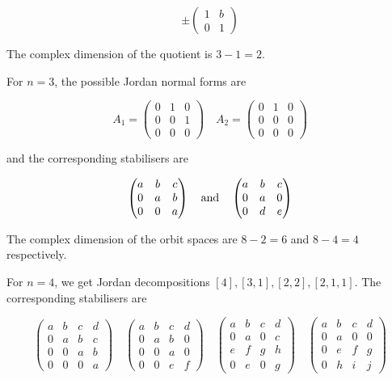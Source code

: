 \documentclass{article}
\begin{document}
\[\pm\begin{pmatrix}
    1 & b \\ 0 & 1
\end{pmatrix}\]

The complex dimension of the quotient is \(3 - 1 = 2\).

For \(n = 3\), the possible Jordan normal forms are

\[A_1 = \begin{pmatrix}
    0 & 1 & 0 \\
    0 & 0 & 1 \\
    0 & 0 & 0
\end{pmatrix} \quad A_2 = \begin{pmatrix}
    0 & 1 & 0 \\
    0 & 0 & 0 \\
    0 & 0 & 0
\end{pmatrix}\]

and the corresponding stabilisers are

\[\begin{pmatrix}
    a & b & c \\
    0 & a & b \\
    0 & 0 & a
\end{pmatrix} \qqtext{and} \begin{pmatrix}
    a & b & c \\
    0 & a & 0 \\
    0 & d & e
\end{pmatrix}\]

The complex dimension of the orbit spaces are \(8 - 2 = 6\) and \(8 - 4 = 4\) respectively.

For \(n=4\), we get Jordan decompositions \([4], [3, 1], [2, 2], [2, 1, 1]\). The corresponding stabilisers are

\[\begin{pmatrix}
    a & b & c & d \\
    0 & a & b & c \\
    0 & 0 & a & b \\
    0 & 0 & 0 & a
\end{pmatrix} \quad \begin{pmatrix}
    a & b & c & d \\
    0 & a & b & 0 \\
    0 & 0 & a & 0 \\
    0 & 0 & e & f
\end{pmatrix} \quad \begin{pmatrix}
    a & b & c & d \\
    0 & a & 0 & c \\
    e & f & g & h \\
    0 & e & 0 & g
\end{pmatrix} \quad \begin{pmatrix}
    a & b & c & d \\
    0 & a & 0 & 0 \\
    0 & e & f & g \\
    0 & h & i & j
\end{pmatrix}\]
\end{document}
